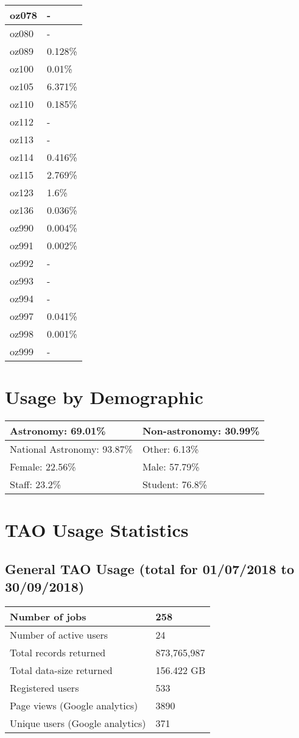 \documentclass{article}%
\begin{document}
\begin{longtabu}{X[l] X[r]}
\hline%
oz078&{-}\\%
\hline%
oz080&{-}\\%
\hline%
oz089&0.128\%\\%
\hline%
oz100&0.01\%\\%
\hline%
oz105&6.371\%\\%
\hline%
oz110&0.185\%\\%
\hline%
oz112&{-}\\%
\hline%
oz113&{-}\\%
\hline%
oz114&0.416\%\\%
\hline%
oz115&2.769\%\\%
\hline%
oz123&1.6\%\\%
\hline%
oz136&0.036\%\\%
\hline%
oz990&0.004\%\\%
\hline%
oz991&0.002\%\\%
\hline%
oz992&{-}\\%
\hline%
oz993&{-}\\%
\hline%
oz994&{-}\\%
\hline%
oz997&0.041\%\\%
\hline%
oz998&0.001\%\\%
\hline%
oz999&{-}\\%
\hline%
\end{longtabu}%
\section{Usage by Demographic}%

%
\begin{longtabu}{X[l] X[l]}%
Astronomy:  69.01\%&Non{-}astronomy:  30.99\%\\%
\hline%
National Astronomy:  93.87\%&Other:  6.13\%\\%
\hline%
Female:  22.56\%&Male:  57.79\%\\%
\hline%
Staff:  23.2\%&Student:  76.8\%\\%
\hline%
\end{longtabu}%
\newpage%
\section{TAO Usage Statistics}%

%
\subsection{General TAO Usage (total for 01/07/2018 to 30/09/2018)}%

%
\begin{longtabu}{X[l] X[l]}%
Number of jobs&258\\%
\hline%
Number of active users&24\\%
\hline%
Total records returned&873,765,987\\%
\hline%
Total data{-}size returned&156.422 GB\\%
\hline%
Registered users&533\\%
\hline%
Page views (Google analytics)&3890\\%
\hline%
Unique users (Google analytics)&371\\%
\hline%
\end{longtabu}%
\end{document}
